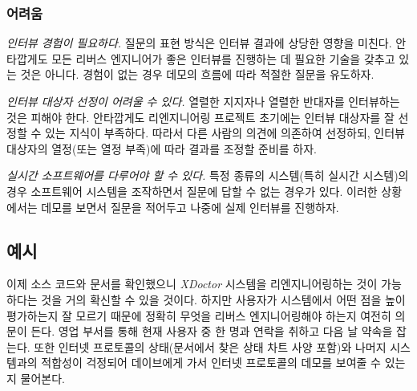 \documentclass[a4paper,10pt,twoside]{book}
\begin{document}
\subsubsection*{어려움}

\begin{bulletlist}
  \item \emph{인터뷰 경험이 필요하다.}
질문의 표현 방식은 인터뷰 결과에 상당한 영향을 미친다. 안타깝게도 모든 리버스 엔지니어가 좋은 인터뷰를 진행하는 데 필요한 기술을 갖추고 있는 것은 아니다. 경험이 없는 경우 데모의 흐름에 따라 적절한 질문을 유도하자.

  \item \emph{인터뷰 대상자 선정이 어려울 수 있다.}
열렬한 지지자나 열렬한 반대자를 인터뷰하는 것은 피해야 한다. 안타깝게도 리엔지니어링 프로젝트 초기에는 인터뷰 대상자를 잘 선정할 수 있는 지식이 부족하다. 따라서 다른 사람의 의견에 의존하여 선정하되, 인터뷰 대상자의 열정(또는 열정 부족)에 따라 결과를 조정할 준비를 하자.

  \item \emph{실시간 소프트웨어를 다루어야 할 수 있다.}
특정 종류의 시스템(특히 실시간 시스템)의 경우 소프트웨어 시스템을 조작하면서 질문에 답할 수 없는 경우가 있다. 이러한 상황에서는 데모를 보면서 질문을 적어두고 나중에 실제 인터뷰를 진행하자.
\end{bulletlist}

\subsection*{예시}

이제 소스 코드와 문서를 확인했으니 \emph{XDoctor} 시스템을 리엔지니어링하는 것이 가능하다는 것을 거의 확신할 수 있을 것이다. 하지만 사용자가 시스템에서 어떤 점을 높이 평가하는지 잘 모르기 때문에 정확히 무엇을 리버스 엔지니어링해야 하는지 여전히 의문이 든다. 영업 부서를 통해 현재 사용자 중 한 명과 연락을 취하고 다음 날 약속을 잡는다. 또한 인터넷 프로토콜의 상태(문서에서 찾은 상태 차트 사양 포함)와 나머지 시스템과의 적합성이 걱정되어 데이브에게 가서 인터넷 프로토콜의 데모를 보여줄 수 있는지 물어본다.
\end{document}
